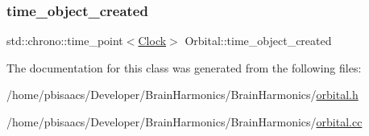 \mbox{\label{classOrbital_a0c5c5ea93a03de69e7aa0267d74d8740}} 
\subsubsection{\texorpdfstring{time\+\_\+object\+\_\+created}{time\_object\_created}}
{\footnotesize\ttfamily std\+::chrono\+::time\+\_\+point$<$\mbox{\hyperlink{universe_8h_a0ef8d951d1ca5ab3cfaf7ab4c7a6fd80}{Clock}}$>$ Orbital\+::time\+\_\+object\+\_\+created\hspace{0.3cm}{\ttfamily [private]}}



The documentation for this class was generated from the following files\+:\begin{DoxyCompactItemize}
\item 
/home/pbisaacs/\+Developer/\+Brain\+Harmonics/\+Brain\+Harmonics/\mbox{\hyperlink{orbital_8h}{orbital.\+h}}\item 
/home/pbisaacs/\+Developer/\+Brain\+Harmonics/\+Brain\+Harmonics/\mbox{\hyperlink{orbital_8cc}{orbital.\+cc}}\end{DoxyCompactItemize}
